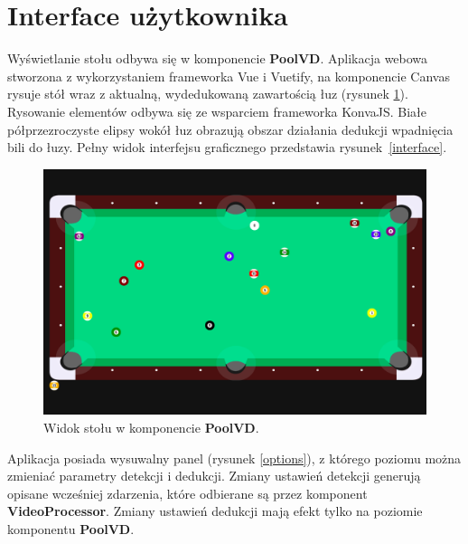 \documentclass[12pt]{article}
\begin{document}
\section{Interface użytkownika}

Wyświetlanie stołu odbywa się w komponencie \textbf{PoolVD}. Aplikacja webowa stworzona z wykorzystaniem frameworka Vue i Vuetify, na komponencie Canvas rysuje stół wraz z aktualną, wydedukowaną zawartością łuz (rysunek \ref{pool1}). Rysowanie elementów odbywa się ze wsparciem frameworka KonvaJS\cite{konva}. Białe półprzezroczyste elipsy wokół łuz obrazują obszar działania dedukcji wpadnięcia bili do łuzy. Pełny widok interfejsu graficznego przedstawia rysunek~\ref{interface}.

\begin{figure}[!h]
    \centering
    \includegraphics[width=15cm]{./images/pool1.png}
    \caption{Widok stołu w komponencie \textbf{PoolVD}.}
    \label{pool1}
\end{figure}

Aplikacja posiada wysuwalny panel (rysunek \ref{options}), z którego poziomu można zmieniać parametry detekcji i dedukcji. Zmiany ustawień detekcji generują opisane wcześniej zdarzenia, które odbierane są przez komponent \textbf{VideoProcessor}. Zmiany ustawień dedukcji mają efekt tylko na poziomie komponentu \textbf{PoolVD}.
\end{document}
